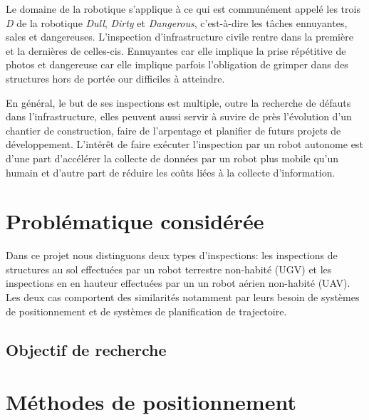 \label{sec:Introduction}  %
Le domaine de la robotique s'applique à ce qui est communément appelé les trois \emph{D} de la robotique \emph{Dull}, \emph{Dirty} et \emph{Dangerous}, c'est-à-dire les tâches ennuyantes, sales et dangereuses. L'inspection d'infrastructure civile rentre dans la première et la dernières de celles-cis. Ennuyantes car elle implique la prise répétitive de photos et dangereuse car elle implique parfois l'obligation de grimper dans des structures hors de portée our difficiles à atteindre.

En général, le but de ses inspections est multiple, outre la recherche de défauts dans l'infrastructure, elles peuvent aussi servir à suvire de près l'évolution d'un chantier de construction, faire de l'arpentage et planifier de futurs projets de développement. L'intérêt de faire exécuter l'inspection par un robot autonome est d'une part d'accélérer la collecte de données par un robot plus mobile qu'un humain et d'autre part de réduire les coûts liées à la collecte d'information.

\section{Problématique considérée}

Dans ce projet nous distinguons deux types d'inspections: les inspections de structures au sol effectuées par un robot terrestre non-habité (UGV) et les inspections en en hauteur effectuées par un un robot aérien non-habité (UAV). Les deux cas comportent des similarités notamment par leurs besoin de systèmes de positionnement et de systèmes de planification de trajectoire.

\subsection{Objectif de recherche}

\section{Méthodes de positionnement}

